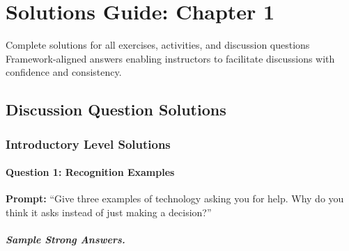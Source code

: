 
\chapter{Solutions Guide: Chapter 1}
\label{ch:solutions-ch01}

\begin{chapterquote}{Complete solutions for all exercises, activities, and discussion questions}
Framework-aligned answers enabling instructors to facilitate discussions with confidence and consistency.
\end{chapterquote}

\section{Discussion Question Solutions}

\subsection{Introductory Level Solutions}

\subsubsection{Question 1: Recognition Examples}

\textbf{Prompt:} ``Give three examples of technology asking you for help. Why do you think it asks instead of just making a decision?''

\paragraph{Sample Strong Answers.}

